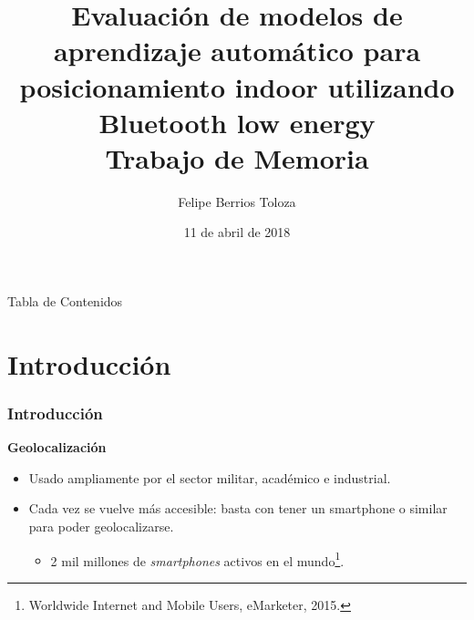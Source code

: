 \documentclass[mathserif]{beamer}
\title[Evaluación de modelos de aprendizaje automático
para posicionamiento indoor utilizando Bluetooth
low energy]{Evaluación de modelos de aprendizaje automático
para posicionamiento indoor utilizando Bluetooth
low energy\\\normalsize Trabajo de Memoria} %
\author{Felipe Berrios Toloza} %
\institute[UTFSM] %
{
Universidad Técnica Federico Santa María \\ %
\medskip
\textit{felipe.berriost@alumnos.usm.cl} %
}
\date{11 de abril de 2018} %
\begin{document}
\begin{frame}
\titlepage %
\end{frame}

\begin{frame}{Tabla de Contenidos}
\begin{multicols}{2}
  \tableofcontents
\end{multicols}
\end{frame}




\section{Introducción} 

\begin{frame}
\frametitle{Introducción}

\textbf{Geolocalización}
\begin{itemize}


\item Usado ampliamente por el sector militar, académico e industrial.

\item Cada vez se vuelve más accesible: basta con tener un smartphone o similar para poder geolocalizarse.

\begin{itemize}
\item 2 mil millones de \textit{smartphones} activos en el mundo\footnote{Worldwide Internet and Mobile Users, eMarketer, 2015.}.
\end{itemize}

\end{itemize}



\end{frame}
\end{document}

